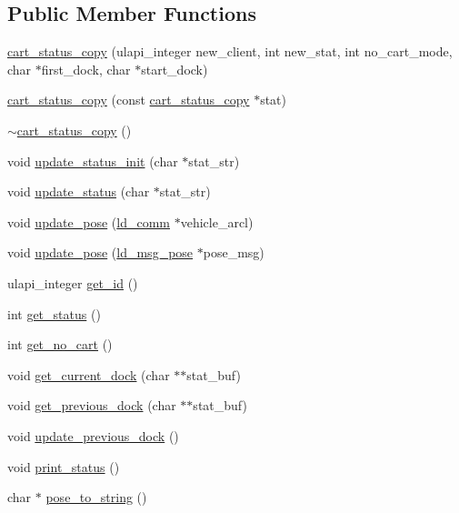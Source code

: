 \subsection*{Public Member Functions}
\begin{DoxyCompactItemize}
\item 
\mbox{\hyperlink{classcart__status__copy_a20571920a3d289d2323ad3e34b2b5384}{cart\+\_\+status\+\_\+copy}} (ulapi\+\_\+integer new\+\_\+client, int new\+\_\+stat, int no\+\_\+cart\+\_\+mode, char $\ast$first\+\_\+dock, char $\ast$start\+\_\+dock)
\item 
\mbox{\hyperlink{classcart__status__copy_a90c5926fe489811f9ab083de0ff5b058}{cart\+\_\+status\+\_\+copy}} (const \mbox{\hyperlink{classcart__status__copy}{cart\+\_\+status\+\_\+copy}} $\ast$stat)
\item 
\mbox{\hyperlink{classcart__status__copy_a82d5b501ba06b8058da51a94672b3ea3}{$\sim$cart\+\_\+status\+\_\+copy}} ()
\item 
void \mbox{\hyperlink{classcart__status__copy_ac0af1c110916a2fdd7ab7198bdca183a}{update\+\_\+status\+\_\+init}} (char $\ast$stat\+\_\+str)
\item 
void \mbox{\hyperlink{classcart__status__copy_ace79b133b98000c72617917b1f434df8}{update\+\_\+status}} (char $\ast$stat\+\_\+str)
\item 
void \mbox{\hyperlink{classcart__status__copy_abc65e581df602a25f173e06ae5d453bf}{update\+\_\+pose}} (\mbox{\hyperlink{classld__comm}{ld\+\_\+comm}} $\ast$vehicle\+\_\+arcl)
\item 
void \mbox{\hyperlink{classcart__status__copy_ac688410b9b4a237d6ce6379e10f3c8bb}{update\+\_\+pose}} (\mbox{\hyperlink{structld__msg__pose}{ld\+\_\+msg\+\_\+pose}} $\ast$pose\+\_\+msg)
\item 
ulapi\+\_\+integer \mbox{\hyperlink{classcart__status__copy_a30bf6eef16e96b282b4e79ca9ccb36dd}{get\+\_\+id}} ()
\item 
int \mbox{\hyperlink{classcart__status__copy_a482b6c7e3bcd3102028c59dacb70ad00}{get\+\_\+status}} ()
\item 
int \mbox{\hyperlink{classcart__status__copy_ae9b79c2205e6d9e2c64ac206cf551366}{get\+\_\+no\+\_\+cart}} ()
\item 
void \mbox{\hyperlink{classcart__status__copy_abcd7994b919a1a5191df8d29fceacbb3}{get\+\_\+current\+\_\+dock}} (char $\ast$$\ast$stat\+\_\+buf)
\item 
void \mbox{\hyperlink{classcart__status__copy_a8341c76c3b3c10809ae24232dbe9b865}{get\+\_\+previous\+\_\+dock}} (char $\ast$$\ast$stat\+\_\+buf)
\item 
void \mbox{\hyperlink{classcart__status__copy_a49621a3d5ab294434c04b17668c2d613}{update\+\_\+previous\+\_\+dock}} ()
\item 
void \mbox{\hyperlink{classcart__status__copy_a6a05f2781c3c5547b9f5fff2161b829f}{print\+\_\+status}} ()
\item 
char $\ast$ \mbox{\hyperlink{classcart__status__copy_a1b4788c35bb97d5447b0a7260a85c40d}{pose\+\_\+to\+\_\+string}} ()
\end{DoxyCompactItemize}
